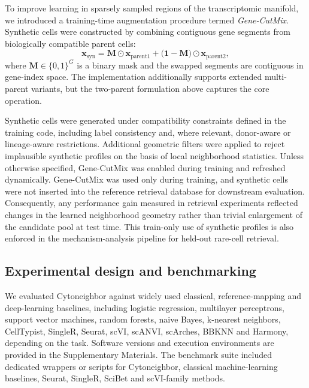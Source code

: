 \documentclass[11pt]{article}
\begin{document}
To improve learning in sparsely sampled regions of the transcriptomic manifold, we introduced a training-time augmentation procedure termed \textit{Gene-CutMix}. Synthetic cells were constructed by combining contiguous gene segments from biologically compatible parent cells:
\begin{equation}
\mathbf{x}_{\mathrm{syn}}
=
\mathbf{M}\odot \mathbf{x}_{\mathrm{parent1}}
+
\bigl(\mathbf{1}-\mathbf{M}\bigr)\odot \mathbf{x}_{\mathrm{parent2}},
\label{eq:genecutmix}
\end{equation}
where $\mathbf{M} \in \{0,1\}^{G}$ is a binary mask and the swapped segments are contiguous in gene-index space\cite{Yun2019CutMix}. The implementation additionally supports extended multi-parent variants, but the two-parent formulation above captures the core operation.

Synthetic cells were generated under compatibility constraints defined in the training code, including label consistency and, where relevant, donor-aware or lineage-aware restrictions. Additional geometric filters were applied to reject implausible synthetic profiles on the basis of local neighborhood statistics. Unless otherwise specified, Gene-CutMix was enabled during training and refreshed dynamically. Gene-CutMix was used only during training, and synthetic cells were not inserted into the reference retrieval database for downstream evaluation. Consequently, any performance gain measured in retrieval experiments reflected changes in the learned neighborhood geometry rather than trivial enlargement of the candidate pool at test time. This train-only use of synthetic profiles is also enforced in the mechanism-analysis pipeline for held-out rare-cell retrieval. 

\subsection{Experimental design and benchmarking}

We evaluated Cytoneighbor against widely used classical, reference-mapping and deep-learning baselines, including logistic regression, multilayer perceptrons, support vector machines, random forests, naive Bayes, k-nearest neighbors, CellTypist, SingleR, Seurat, scVI, scANVI, scArches, BBKNN and Harmony, depending on the task\cite{Aran2019SingleR,DominguezConde2022CellTypist,Stuart2019Seurat,Hao2021Multimodal,Lopez2018scVI,Xu2021scANVI,Lotfollahi2022scArches,Korsunsky2019Harmony,Polanski2020BBKNN}. Software versions and execution environments are provided in the Supplementary Materials. The benchmark suite included dedicated wrappers or scripts for Cytoneighbor, classical machine-learning baselines, Seurat, SingleR, SciBet and scVI-family methods. 
\end{document}
